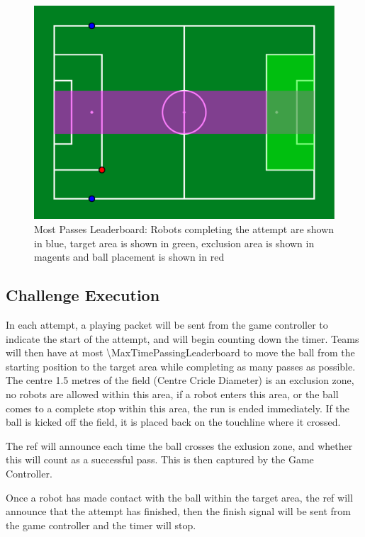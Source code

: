 \begin{figure}[t]
    \centerline{\includegraphics[width=\columnwidth]{figs/leaderboards/passing_leaderboard.pdf}}
    \caption{Most Passes Leaderboard: Robots completing the attempt are shown in blue, target area is shown in green, exclusion area is shown in magents and ball placement is shown in red}
    \label{fig:passing_leaderboard}
\end{figure}
\subsection{Challenge Execution}
In each attempt, a playing packet will be sent from the game controller to indicate the start of the attempt,
and will begin counting down the timer.
Teams will then have at most \qty{\MaxTimePassingLeaderboard}{\sec} to move the ball from the starting
position to the target area while completing as many passes as possible. The centre
1.5 metres of the field (Centre Cricle Diameter) is an exclusion zone, no robots are allowed within this area,
if a robot enters this area, or the ball comes to a complete stop
within this area, the run is ended immediately. If the ball is kicked off the field,
it is placed back on the touchline where it crossed.

The ref will announce each time the ball crosses the exlusion zone, and whether this will
count as a successful pass. This is then captured by the Game Controller.

Once a robot has made contact with the ball within the target area, the ref will announce that the
attempt has finished, then the finish signal will be sent from the game controller and the timer will stop.


